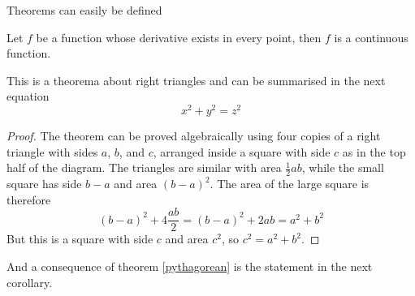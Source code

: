 Theorems can easily be defined

\begin{definition}
  Let $f$ be a function whose derivative exists in every point, then $f$ is 
  a continuous function.
\end{definition}

\begin{theorem}
  \label{pythagorean}
  This is a theorema about right triangles and can be summarised in the next 
  equation 
  \[ x^2 + y^2 = z^2 \]
\end{theorem}

\begin{proof}
  The theorem can be proved algebraically using four copies of a right triangle with sides $a$, $b$, and $c$, arranged inside a square with side $c$ as in the top half of the diagram. The triangles are similar with area $\tfrac12ab$, while the small square has side $b-a$ and area $(b-a)^2$. The area of the large square is therefore
  $$(b-a)^2+4\frac{ab}{2} = (b-a)^2+2ab = a^2+b^2$$  
  But this is a square with side $c$ and area $c^2$, so $c^2 = a^2 + b^2$.
\end{proof}

And a consequence of theorem \ref{pythagorean} is the statement in the next 
corollary.